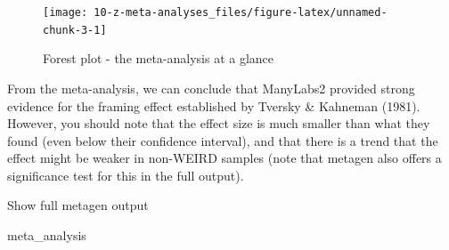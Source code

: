 \documentclass[
]{book}
\newenvironment{Shaded}{\begin{snugshade}}{\end{snugshade}}
\newcommand{\NormalTok}[1]{#1}
\begin{document}
\begin{figure}

{\centering \texttt{[image: 10-z-meta-analyses\_files/figure-latex/unnamed-chunk-3-1]} 

}

\caption{Forest plot - the meta-analysis at a glance}\label{fig:unnamed-chunk-3}
\end{figure}

From the meta-analysis, we can conclude that ManyLabs2 provided strong evidence for the framing effect established by Tversky \& Kahneman (1981). However, you should note that the effect size is much smaller than what they found (even below their confidence interval), and that there is a trend that the effect might be weaker in non-WEIRD samples (note that metagen also offers a significance test for this in the full output).

Show full metagen output

\begin{Shaded}
\begin{Highlighting}[]
\NormalTok{meta_analysis}
\end{Highlighting}
\end{Shaded}
\end{document}
